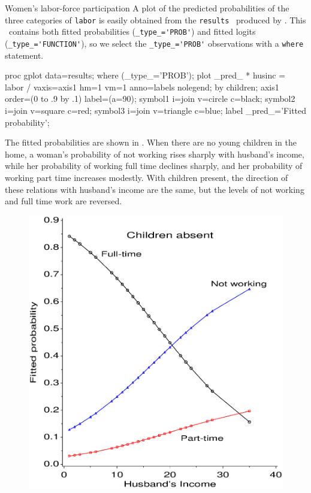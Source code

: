 \begin{Example}[wlfpart2]{Women's labor-force participation}
A plot of the predicted probabilities of the three categories of
\texttt{labor} is easily obtained from the \texttt{results}
\Dset\ produced by .
This \Dset\ contains both fitted probabilities (\verb|_type_='PROB'|)
and fitted logits (\verb|_type_='FUNCTION'|), so we select the
\verb|_type_='PROB'| observations with a \texttt{where} statement.
\begin{listing}
proc gplot data=results;
   where (_type_='PROB');
   plot _pred_ * husinc = labor /
      vaxis=axis1 hm=1 vm=1 anno=labels nolegend;
   by children;
   axis1 order=(0 to .9 by .1) label=(a=90);
   symbol1 i=join v=circle   c=black;
   symbol2 i=join v=square   c=red;
   symbol3 i=join v=triangle c=blue;
   label _pred_='Fitted probability';
\end{listing}
The fitted probabilities are shown in .
When there are no young children in the home, a woman's probability
of not working rises sharply with husband's income, while her
probability of working full time declines sharply, and her
probability of working part time increases modestly.
With children present, the direction of these relations with husband's
income are the same, but the levels of not working and full
time work are reversed.
\begin{figure}[htb]
 \begin{minipage}[b]{.49\linewidth}
  \centering
  \includegraphics[width=1\linewidth]{ch6/fig/wlfpart31}

\end{minipage}
\end{figure}
\end{Example}
